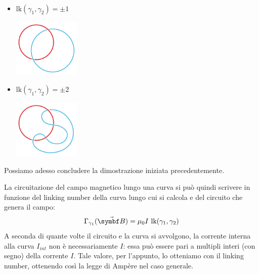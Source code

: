 \begin{example}~
	\begin{itemize}
		\item $\textrm{lk}(\gamma_1,\gamma_2)=\pm 1$
		\begin{center}
			\includegraphics[width=0.25\textwidth]{images/chp9/chp9linknumb1.pdf}
		\end{center}
		\item $\textrm{lk}(\gamma_1,\gamma_2)=\pm 2$
		\begin{center}
			\includegraphics[width=0.25\textwidth]{images/chp9/chp9linknumb2.pdf}
		\end{center}
	\end{itemize}
\end{example}
Possiamo adesso concludere la dimostrazione iniziata precedentemente.
\begin{demonstrationwt}
La circuitazione del campo magnetico lungo una curva si può quindi scrivere in funzione del linking number della curva lungo cui si calcola e del circuito che genera il campo:
\begin{equation*}
	\Gamma_{\gamma_1}(\vba{B})=\mu_0 I\ \textrm{lk}(\gamma_1,\gamma_2)
\end{equation*}
A seconda di quante volte il circuito e la curva si avvolgono, la corrente interna alla curva $I_{int}$ non è necessariamente $I$: essa può essere pari a multipli interi (con segno) della corrente $I$. Tale valore, per l'appunto, lo otteniamo con il linking number, ottenendo così la legge di Ampère nel caso generale.
\end{demonstrationwt}

